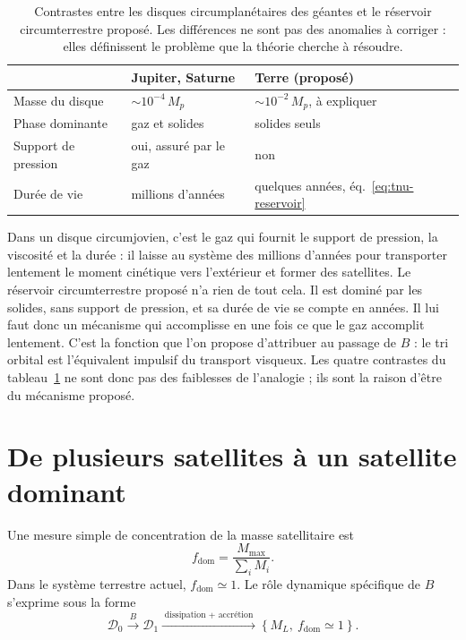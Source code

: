 \documentclass[11pt,a4paper,openany]{report}
\begin{document}
\begin{table}[htbp]
\centering
\small
\caption{Contrastes entre les disques circumplanétaires des géantes et le réservoir
circumterrestre proposé. Les différences ne sont pas des anomalies à corriger : elles définissent
le problème que la théorie cherche à résoudre.}
\label{tab:contraste-disques}
\begin{tabularx}{\textwidth}{>{\raggedright\arraybackslash}p{4.2cm}
>{\raggedright\arraybackslash}X >{\raggedright\arraybackslash}X}
\toprule
 & \textbf{Jupiter, Saturne} & \textbf{Terre (proposé)} \\
\midrule
Masse du disque & $\sim10^{-4}\,M_p$ & $\sim10^{-2}\,M_p$, à expliquer \\[3pt]
Phase dominante & gaz et solides & solides seuls \\[3pt]
Support de pression & oui, assuré par le gaz & non \\[3pt]
Durée de vie & millions d'années & quelques années, éq.~\eqref{eq:tnu-reservoir} \\
\bottomrule
\end{tabularx}
\end{table}

\begin{ideephys}
Dans un disque circumjovien, c'est le gaz qui fournit le support de pression, la viscosité et la
durée : il laisse au système des millions d'années pour transporter lentement le moment cinétique
vers l'extérieur et former des satellites. Le réservoir circumterrestre proposé n'a rien de tout
cela. Il est dominé par les solides, sans support de pression, et sa durée de vie se compte en
années. Il lui faut donc un mécanisme qui accomplisse en une fois ce que le gaz accomplit
lentement. C'est la fonction que l'on propose d'attribuer au passage de $B$ : le tri orbital est
l'équivalent impulsif du transport visqueux. Les quatre contrastes du
tableau~\ref{tab:contraste-disques} ne sont donc pas des faiblesses de l'analogie ; ils sont la
raison d'être du mécanisme proposé.
\end{ideephys}

\section{De plusieurs satellites à un satellite dominant}

Une mesure simple de concentration de la masse satellitaire est
\begin{equation}
f_{\mathrm{dom}}=\frac{M_{\max}}{\sum_i M_i}.
\label{eq:fdom}
\end{equation}
Dans le système terrestre actuel, $f_{\mathrm{dom}}\simeq1$. Le rôle dynamique spécifique de
$B$ s'exprime sous la forme
\begin{equation}
\mathcal{D}_0\xrightarrow{\;B\;}\mathcal{D}_1
\xrightarrow{\;\text{dissipation + accrétion}\;}\left\{M_L,\ f_{\mathrm{dom}}\simeq1\right\}.
\label{eq:roleB}
\end{equation}
\end{document}

